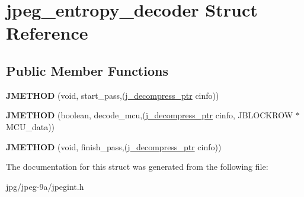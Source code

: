 \hypertarget{structjpeg__entropy__decoder}{\section{jpeg\+\_\+entropy\+\_\+decoder Struct Reference}
\label{structjpeg__entropy__decoder}
}
\subsection*{Public Member Functions}
\begin{DoxyCompactItemize}
\item 
\hypertarget{structjpeg__entropy__decoder_ab1b90e7d9348599cecc7b6c86d291ae4}{{\bfseries J\+M\+E\+T\+H\+O\+D} (void, start\+\_\+pass,(\hyperlink{structjpeg__decompress__struct}{j\+\_\+decompress\+\_\+ptr} cinfo))}\label{structjpeg__entropy__decoder_ab1b90e7d9348599cecc7b6c86d291ae4}

\item 
\hypertarget{structjpeg__entropy__decoder_a151f6f7497ba68935cca4b28ee75a596}{{\bfseries J\+M\+E\+T\+H\+O\+D} (boolean, decode\+\_\+mcu,(\hyperlink{structjpeg__decompress__struct}{j\+\_\+decompress\+\_\+ptr} cinfo, J\+B\+L\+O\+C\+K\+R\+O\+W $\ast$M\+C\+U\+\_\+data))}\label{structjpeg__entropy__decoder_a151f6f7497ba68935cca4b28ee75a596}

\item 
\hypertarget{structjpeg__entropy__decoder_af016a41a26657b3f056b2edbc0d24014}{{\bfseries J\+M\+E\+T\+H\+O\+D} (void, finish\+\_\+pass,(\hyperlink{structjpeg__decompress__struct}{j\+\_\+decompress\+\_\+ptr} cinfo))}\label{structjpeg__entropy__decoder_af016a41a26657b3f056b2edbc0d24014}

\end{DoxyCompactItemize}


The documentation for this struct was generated from the following file\+:\begin{DoxyCompactItemize}
\item 
jpg/jpeg-\/9a/jpegint.\+h\end{DoxyCompactItemize}
